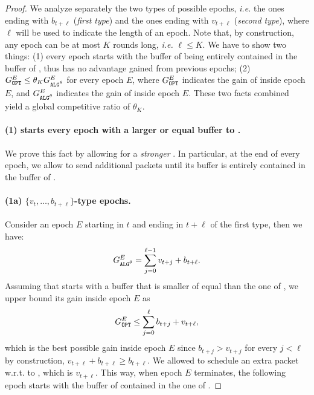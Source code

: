 \upperboundtheta*
\begin{proof}
    We analyze separately the two types of possible epochs, \emph{i.e.} the ones ending with $b_{t+\ell}$ (\textit{first type}) and the ones ending with $v_{t+\ell}$ (\textit{second type}), where $\ell$ will be used to indicate the length of an epoch. Note that, by construction, any epoch can be at most $K$ rounds long, \emph{i.e.} $\ell \le K$. We have to show two things: (1) every epoch starts with the buffer of \opt being entirely contained in the buffer of \algtheta, thus \opt has no advantage gained from previous epochs; (2) $\Gopt^E \le \theta_K \Galgtheta^E$ for every epoch $E$, where $\Gopt^E$ indicates the gain of \opt inside epoch $E$, and $\Galgtheta^E$ indicates the gain of \algtheta inside epoch $E$. These two facts combined yield a global competitive ratio of $\theta_K$.
    \paragraph{(1) \algtheta starts every epoch with a larger or equal buffer to \opt.} We prove this fact by allowing for a \textit{stronger} \opt. In particular, at the end of every epoch, we allow \opt to send additional packets until its buffer is entirely contained in the buffer of \algtheta. 
    \paragraph{(1a) $\{v_t, \ldots, b_{t+\ell}\}$-type epochs.} Consider an epoch $E$ starting in $t$ and ending in $t+\ell$ of the first type, then we have:
    \begin{align*}
        \Galgtheta^E = \sum_{j=0}^{\ell-1} v_{t+j} + b_{t+\ell}.
    \end{align*}
    Assuming that \opt starts with a buffer that is smaller of equal than the one of \algtheta, we upper bound its gain inside epoch $E$ as
    \begin{align}
    \label{eq:gopt_bound_i}
        \Gopt^E \le \sum_{j=0}^{\ell} b_{t+j} + v_{t+\ell},
    \end{align}
    which is the best possible gain inside epoch $E$ since $b_{t+j}>v_{t+j}$ for every $j<\ell$ by construction, $v_{t+\ell}+b_{t+\ell}\ge b_{t+\ell}$. We allowed \opt to schedule an extra packet w.r.t. to \algtheta, which is $v_{t+\ell}$. This way, when epoch $E$ terminates, the following epoch starts with the buffer of \opt contained in the one of \algtheta. 

\end{proof}
